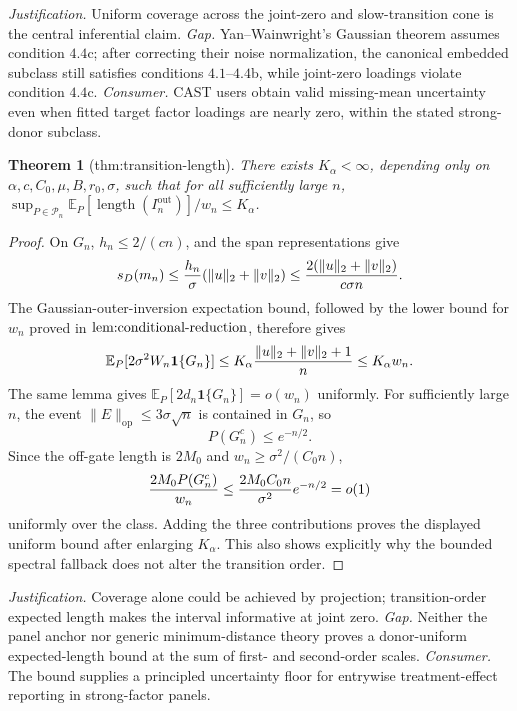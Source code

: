 \documentclass{article}
\newtheorem{theorem}{Theorem}
\begin{document}
\par\smallskip\noindent \textit{Justification.} Uniform coverage across the joint-zero and slow-transition cone is the central inferential claim. \textit{Gap.} Yan--Wainwright's Gaussian theorem assumes condition \(4.4\mathrm c\); after correcting their noise normalization, the canonical embedded subclass still satisfies conditions \(4.1\)--\(4.4\mathrm b\), while joint-zero loadings violate condition \(4.4\mathrm c\). \textit{Consumer.} CAST users obtain valid missing-mean uncertainty even when fitted target factor loadings are nearly zero, within the stated strong-donor subclass.

\begin{theorem}[thm:transition-length]\label{thm:transition-length}
There exists \(K_\alpha<\infty\), depending only on \(\alpha,c,C_0,\mu,B,r_0,\sigma\), such that for all sufficiently large \(n\), \(\sup_{P\in\mathcal P_n}\mathbb E_P[\operatorname{length}(I_n^{\mathrm{out}})]/w_n\le K_\alpha\).
\end{theorem}
\begin{proof}
On \(G_n\), \(h_n\le2/(cn)\), and the span representations give
\[
 s_D(m_n)
 \le {h_n\over\sigma}(\|u\|_2+\|v\|_2)
 \le {2(\|u\|_2+\|v\|_2)\over c\sigma n}.
\]
The Gaussian-outer-inversion expectation bound, followed by the lower bound for \(w_n\) proved in \(\textnormal{lem:conditional-reduction}\), therefore gives
\[
 \mathbb E_P[2\sigma^2W_n\mathbf1\{G_n\}]
 \le K_\alpha {\|u\|_2+\|v\|_2+1\over n}
 \le K_\alpha w_n.
\]
The same lemma gives \(\mathbb E_P[2d_n\mathbf1\{G_n\}]=o(w_n)\) uniformly.  For sufficiently large \(n\), the event \(\|E\|_{\mathrm{op}}\le3\sigma\sqrt n\) is contained in \(G_n\), so
\[
 P(G_n^c)\le e^{-n/2}.
\]
Since the off-gate length is \(2M_0\) and \(w_n\ge\sigma^2/(C_0n)\),
\[
 {2M_0P(G_n^c)\over w_n}
 \le {2M_0C_0n\over\sigma^2}e^{-n/2}=o(1)
\]
uniformly over the class.  Adding the three contributions proves the displayed uniform bound after enlarging \(K_\alpha\).  This also shows explicitly why the bounded spectral fallback does not alter the transition order.
\end{proof}
\par\smallskip\noindent \textit{Justification.} Coverage alone could be achieved by projection; transition-order expected length makes the interval informative at joint zero. \textit{Gap.} Neither the panel anchor nor generic minimum-distance theory proves a donor-uniform expected-length bound at the sum of first- and second-order scales. \textit{Consumer.} The bound supplies a principled uncertainty floor for entrywise treatment-effect reporting in strong-factor panels.
\end{document}
